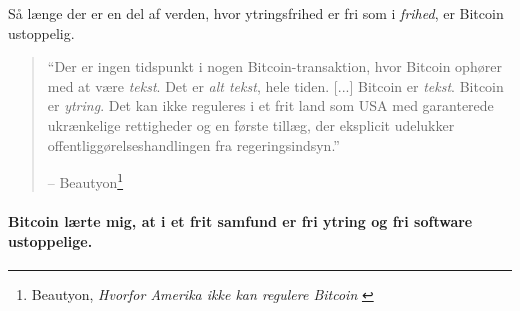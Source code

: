 Så længe der er en del af verden, hvor ytringsfrihed er fri som i \textit{frihed}, er Bitcoin ustoppelig.

\begin{quotation}\begin{samepage}
\enquote{Der er ingen tidspunkt i nogen Bitcoin-transaktion, hvor Bitcoin ophører med at være \textit{tekst}. Det er \textit{alt tekst}, hele tiden. [...] Bitcoin er \textit{tekst}. Bitcoin er \textit{ytring}. Det kan ikke reguleres i et frit land som USA med garanterede ukrænkelige rettigheder og en første tillæg, der eksplicit udelukker offentliggørelseshandlingen fra regeringsindsyn.}
\begin{flushright} -- Beautyon\footnote{Beautyon, \textit{Hvorfor Amerika ikke kan regulere
Bitcoin} \cite{america-regulate-bitcoin}}
\end{flushright}\end{samepage}\end{quotation}

\paragraph{Bitcoin lærte mig, at i et frit samfund er fri ytring og fri software ustoppelige.}

%
%
%
%
%
%
%
